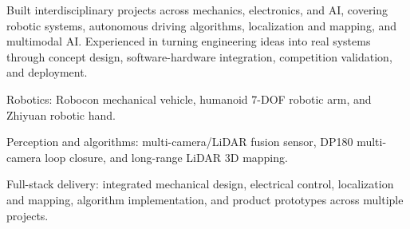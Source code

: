 
\begin{cvparagraph}
Built interdisciplinary projects across mechanics, electronics, and AI, covering robotic systems, autonomous driving algorithms, localization and mapping, and multimodal AI. Experienced in turning engineering ideas into real systems through concept design, software-hardware integration, competition validation, and deployment.
\end{cvparagraph}
\begin{cvitems}
  \item {Robotics: Robocon mechanical vehicle, humanoid 7-DOF robotic arm, and Zhiyuan robotic hand.}
  \item {Perception and algorithms: multi-camera/LiDAR fusion sensor, DP180 multi-camera loop closure, and long-range LiDAR 3D mapping.}
  \item {Full-stack delivery: integrated mechanical design, electrical control, localization and mapping, algorithm implementation, and product prototypes across multiple projects.}
\end{cvitems}
